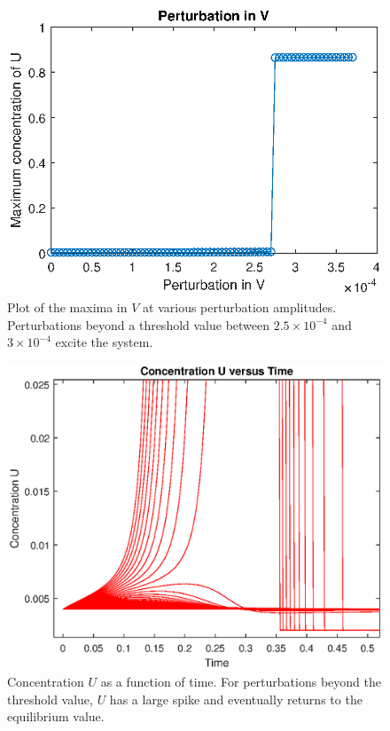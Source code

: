 \documentclass[twocolumn,amsmath,amssymb,aps]{revtex4}
\begin{document}
\begin{figure}[!htb]
	\centering
	\includegraphics[scale=0.6]{excite_2.eps}
	\caption{Plot of the maxima in $V$ at various perturbation amplitudes. Perturbations beyond a threshold value between $2.5\times 10^{-4}$ and $3\times 10^{-4}$ excite the system.}
	\label{fig:Excite3}
\end{figure}


\begin{figure}[!htb]
	\centering
	\includegraphics[scale=0.5]{UvTime.eps}
	\caption{Concentration $U$ as a function of time. For perturbations beyond the threshold value, $U$ has a large spike and eventually returns to the equilibrium value.}
	\label{fig:Excite4}
\end{figure}
\end{document}
